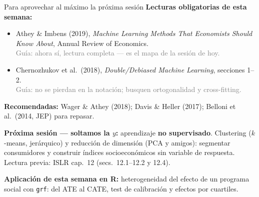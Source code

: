 \documentclass{beamer}
\newcommand{\1}{\mathbb{I}}
\begin{document}
\begin{frame}{Para aprovechar al máximo la próxima sesión}
\small
\textbf{Lecturas obligatorias de esta semana:}
\begin{itemize}\itemsep4pt
  \item Athey \& Imbens (2019), \emph{Machine Learning Methods That Economists Should Know About}, Annual Review of Economics. \\ \textcolor{gray}{Guía: ahora sí, lectura completa --- es el mapa de la sesión de hoy.}
  \item Chernozhukov et al.\ (2018), \emph{Double/Debiased Machine Learning}, secciones 1--2. \\ \textcolor{gray}{Guía: no se pierdan en la notación; busquen ortogonalidad y cross-fitting.}
\end{itemize}

\textbf{Recomendadas:} Wager \& Athey (2018); Davis \& Heller (2017); Belloni et al.\ (2014, JEP) para repasar.
\pause

\vspace{0.2cm}
\textbf{Próxima sesión --- soltamos la $y$:} aprendizaje \textbf{no supervisado}. Clustering ($k$-means, jerárquico) y reducción de dimensión (PCA y amigos): segmentar consumidores y construir índices socioeconómicos sin variable de respuesta. Lectura previa: ISLR cap.\ 12 (secs.\ 12.1--12.2 y 12.4).
\pause

\vspace{0.2cm}
\textbf{Aplicación de esta semana en R:} heterogeneidad del efecto de un programa social con \texttt{grf}: del ATE al CATE, test de calibración y efectos por cuartiles.
\end{frame}
\end{document}
